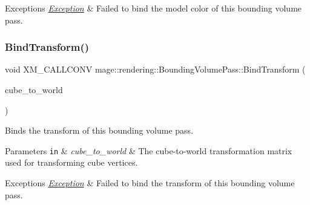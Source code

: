 \begin{DoxyExceptions}{Exceptions}
{\em \hyperlink{classmage_1_1_exception}{Exception}} & Failed to bind the model color of this bounding volume pass. \\
\hline
\end{DoxyExceptions}
\hypertarget{classmage_1_1rendering_1_1_bounding_volume_pass_aa43435b88597d4d9a59047f4558c4bab}{}\label{classmage_1_1rendering_1_1_bounding_volume_pass_aa43435b88597d4d9a59047f4558c4bab} 
\subsubsection{\texorpdfstring{Bind\+Transform()}{BindTransform()}}
{\footnotesize\ttfamily void X\+M\+\_\+\+C\+A\+L\+L\+C\+O\+NV mage\+::rendering\+::\+Bounding\+Volume\+Pass\+::\+Bind\+Transform (\begin{DoxyParamCaption}\item[{F\+X\+M\+M\+A\+T\+R\+IX}]{cube\+\_\+to\+\_\+world }\end{DoxyParamCaption})\hspace{0.3cm}{\ttfamily [private]}}

Binds the transform of this bounding volume pass.


\begin{DoxyParams}[1]{Parameters}
\mbox{\tt in}  & {\em cube\+\_\+to\+\_\+world} & The cube-\/to-\/world transformation matrix used for transforming cube vertices. \\
\hline
\end{DoxyParams}

\begin{DoxyExceptions}{Exceptions}
{\em \hyperlink{classmage_1_1_exception}{Exception}} & Failed to bind the transform of this bounding volume pass. \\
\hline
\end{DoxyExceptions}
\hypertarget{classmage_1_1rendering_1_1_bounding_volume_pass_af6651287f16a21d755c8e304f4997fcf}{}\label{classmage_1_1rendering_1_1_bounding_volume_pass_af6651287f16a21d755c8e304f4997fcf} 
